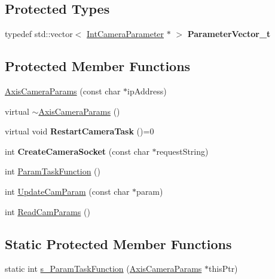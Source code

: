 \subsection*{Protected Types}
\begin{DoxyCompactItemize}
\item 
\hypertarget{classAxisCameraParams_afe977853ce1a00394682deccc5724b79}{
typedef std::vector$<$ \hyperlink{classIntCameraParameter}{IntCameraParameter} $\ast$ $>$ {\bfseries ParameterVector\_\-t}}
\label{classAxisCameraParams_afe977853ce1a00394682deccc5724b79}

\end{DoxyCompactItemize}
\subsection*{Protected Member Functions}
\begin{DoxyCompactItemize}
\item 
\hyperlink{classAxisCameraParams_a3a2ad3b9311c62ed4e0dea45d38e8491}{AxisCameraParams} (const char $\ast$ipAddress)
\item 
virtual \hyperlink{classAxisCameraParams_ac22b45836e3850b9487b5948c133ca3f}{$\sim$AxisCameraParams} ()
\item 
\hypertarget{classAxisCameraParams_a9eca0d513a80dad5b773b50ed28fc00f}{
virtual void {\bfseries RestartCameraTask} ()=0}
\label{classAxisCameraParams_a9eca0d513a80dad5b773b50ed28fc00f}

\item 
\hypertarget{classAxisCameraParams_a80975cc9e014ba7c4d10c1b0e90095d9}{
int {\bfseries CreateCameraSocket} (const char $\ast$requestString)}
\label{classAxisCameraParams_a80975cc9e014ba7c4d10c1b0e90095d9}

\item 
int \hyperlink{classAxisCameraParams_a722d8d9c928800ed855d36e93675e455}{ParamTaskFunction} ()
\item 
int \hyperlink{classAxisCameraParams_a9fd81064b29af41bd912ba53c3811f65}{UpdateCamParam} (const char $\ast$param)
\item 
int \hyperlink{classAxisCameraParams_abad7df9daf125123d55d4fee4ae55d49}{ReadCamParams} ()
\end{DoxyCompactItemize}
\subsection*{Static Protected Member Functions}
\begin{DoxyCompactItemize}
\item 
static int \hyperlink{classAxisCameraParams_abae30b97480c964c5862572837dad21a}{s\_\-ParamTaskFunction} (\hyperlink{classAxisCameraParams}{AxisCameraParams} $\ast$thisPtr)
\end{DoxyCompactItemize}
